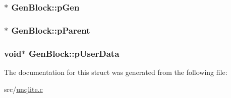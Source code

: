 \hypertarget{struct_gen_block_a0a850a1e68d92ad1745b8e8a0ca9412b}{
\subsubsection[{p\-Gen}]{$\ast$ Gen\-Block\-::p\-Gen}}\label{da/d01/struct_gen_block_a0a850a1e68d92ad1745b8e8a0ca9412b}
\hypertarget{struct_gen_block_a4c5dd80b313b0d29386b1e7d87a72853}{
\subsubsection[{p\-Parent}]{$\ast$ Gen\-Block\-::p\-Parent}}\label{da/d01/struct_gen_block_a4c5dd80b313b0d29386b1e7d87a72853}
\hypertarget{struct_gen_block_a60ea12e5d65e456b00fe799be048eb0a}{
\subsubsection[{p\-User\-Data}]{\setlength{\rightskip}{0pt plus 5cm}void$\ast$ Gen\-Block\-::p\-User\-Data}}\label{da/d01/struct_gen_block_a60ea12e5d65e456b00fe799be048eb0a}


The documentation for this struct was generated from the following file\-:\begin{DoxyCompactItemize}
\item 
src/\hyperlink{unqlite_8c}{unqlite.\-c}\end{DoxyCompactItemize}
